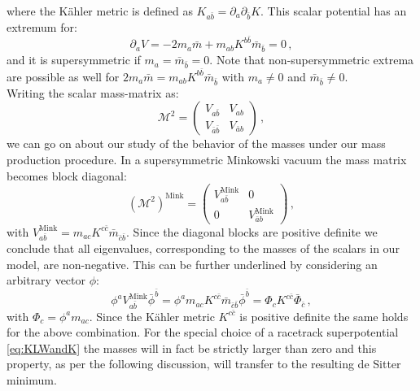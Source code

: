 \documentclass[a4paper,12pt,twoside,openright]{report}
\newcommand{\be}{\begin{equation}}
\newcommand{\ee}{\end{equation}}
\newcommand{\V}{\mathcal{V}}
\begin{document}
where the Kähler metric is defined as $K_{a\bar{b}} = \partial_a \partial_{\bar{b}}K$. This scalar potential has an extremum for:
\be 
\partial_a V = -2 m_a \bar{m} + m_{ab} K^{b\bar{b}} \bar{m}_{\bar{b}}=0\,,
\ee
and it is supersymmetric if $m_a = \bar{m}_{\bar{b}}=0$. Note that non-supersymmetric extrema are possible as well for $2 m_a \bar{m} = m_{ab} K^{b\bar{b}} \bar{m}_{\bar{b}}$ with $m_a \neq 0$ and $\bar{m}_{\bar{b}} \neq 0$.\\
Writing the scalar mass-matrix as:
\be 
\mathcal{M}^2 = \begin{pmatrix} V_{a\bar{b}} & V_{ab}\\V_{\bar{a}\bar{b}} & V_{\bar{a}b}\end{pmatrix}\,,
\ee
we can go on about our study of the behavior of the masses under our mass production procedure. In a supersymmetric Minkowski vacuum the mass matrix becomes block diagonal:
\be 
\left(\mathcal{M}^2\right)^{\text{Mink}} = \begin{pmatrix} V_{a\bar{b}}^{\text{Mink}} &0\\0 & V_{\bar{a}b}^{\text{Mink}}\end{pmatrix}\,,
\ee
with $V_{a\bar{b}}^{\text{Mink}} = m_{ac} K^{c\bar{c}}\bar{m}_{\bar{c}\bar{b}}$. Since the diagonal blocks are positive definite we conclude that all eigenvalues, corresponding to the masses of the scalars in our model, are non-negative. This can be further underlined by considering an arbitrary vector $\phi$:
\be 
\phi^a V_{a\bar{b}}^{\text{Mink}} \bar{\phi}^{\bar{b}} = \phi^a m_{ac} K^{c\bar{c}}\bar{m}_{\bar{c}\bar{b}} \bar{\phi}^{\bar{b}} = \Phi_c K^{c\bar{c}} \bar{\Phi}_{\bar{c}}\,,
\label{eq:MinkPosDef}
\ee
with $\Phi_c = \phi^a m_{ac}$. Since the Kähler metric $K^{c\bar{c}}$ is positive definite the same holds for the above combination. For the special choice of a racetrack superpotential \eqref{eq:KLWandK} the masses will in fact be strictly larger than zero and this property, as per the following discussion, will transfer to the resulting de Sitter minimum. 
\end{document}
